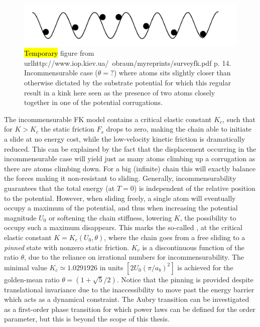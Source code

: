 \begin{figure}[H]
  \centering
  \includegraphics[width=0.5\linewidth]{figures/theory/incommensurable_example.png}
  \caption{\hl{Temporary} figure from
  url{http://www.iop.kiev.ua/~obraun/myreprints/surveyfk.pdf} p. 14.
  Incommensurable case ($\theta = ?$) where atoms sits slightly closer than
  otherwise dictated by the substrate potential for which this regular result in
  a kink here seen as the presence of two atoms closely together in one of the
  potential corrugations.}
  \label{fig:incommensurable_example}
\end{figure}


The incommensurable \acrshort{FK} model contains a critical elastic constant $K_c$, such that for $K > K_c$ the static friction $F_s$ drops to zero, making the chain able to initiate a slide at no energy cost, while the low-velocity kinetic friction is dramatically reduced. This can be explained by the
fact that the displacement occurring in the incommensurable case will yield just
as many atoms climbing up a corrugation as there are atoms climbing down. For a big (infinite) chain this will exactly balance the forces making it
non-resistant to sliding. Generally, incommensurability guarantees that the
total energy (at $T=0$) is independent of the relative position to the
potential. However, when sliding freely, a single atom will eventually occupy a
maximum of the potential, and thus when increasing the potential magnitude $U_0$ or
softening the chain stiffness, lowering $K$, the possibility to occupy such a
maximum disappears. This marks the so-called ,
at the critical elastic constant $K = K_c(U_0, \theta)$, where the chain goes
from a free sliding to a \textit{pinned} state with nonzero static friction.
$K_c$ is a discontinuous function of the ratio $\theta$, due to the reliance on
irrational numbers for incommensurability. The minimal
value $K_c \simeq 1.0291926 $ in units $[2 U_0 (\pi / a_b)^2]$ is achieved for
the golden-mean ratio $\theta = (1+\sqrt{5}/2)$. Notice that the pinning is
provided despite translational invariance due to the inaccessibility to move
past the energy barrier which acts as a dynamical constraint. The Aubry transition can be investigated as a first-order phase transition for which power laws can be defined for the order parameter, but this is beyond the scope of this thesis.

